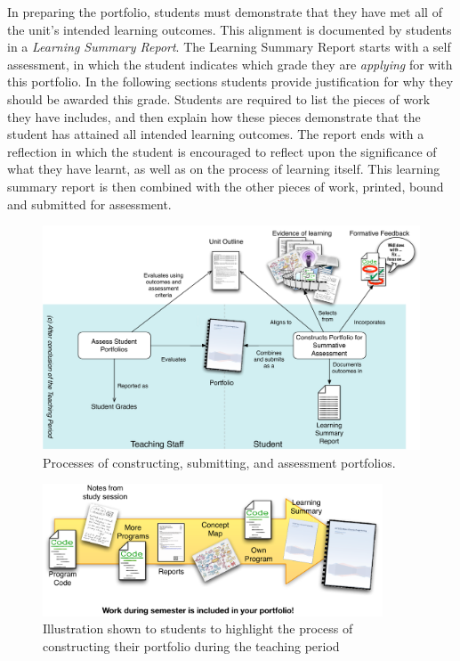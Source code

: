 In preparing the portfolio, students must demonstrate that they have met all of the unit's intended learning outcomes. This alignment is documented by students in a \emph{Learning Summary Report}. The Learning Summary Report starts with a self assessment, in which the student indicates which grade they are \emph{applying} for with this portfolio. In the following sections students provide justification for why they should be awarded this grade. Students are required to list the pieces of work they have includes, and then explain how these pieces demonstrate that the student has attained all intended learning outcomes. The report ends with a reflection in which the student is encouraged to reflect upon the significance of what they have learnt, as well as on the process of learning itself. This learning summary report is then combined with the other pieces of work, printed, bound and submitted for assessment.

\begin{figure}[p]
	\centering
	\includegraphics[width=\textwidth]{PortfolioConstructionAssessment}
	\caption{Processes of constructing, submitting, and assessment portfolios.}
	\label{fig:portfolio_processes}
\end{figure}

\begin{figure}[p]
	\centering
	\includegraphics[width=0.9\textwidth]{PortfolioPieces}
	\caption{Illustration shown to students to highlight the process of constructing their portfolio during the teaching period}
	\label{fig:portfolio_pieces}
\end{figure}

